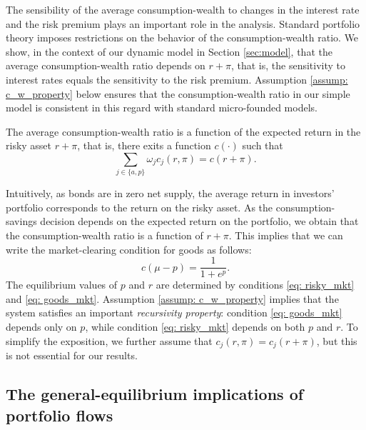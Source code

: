 The sensibility of the average consumption-wealth to changes in the interest rate and the risk premium plays an important role in the analysis. 
Standard portfolio theory imposes restrictions on the behavior of the  consumption-wealth ratio. 
We show, in the context of our dynamic model in Section \ref{sec:model}, that the average consumption-wealth ratio depends on $r+\pi$, that is, the sensitivity to interest rates equals the sensitivity to the risk premium. 
Assumption \ref{assump: c_w_property} below ensures that the consumption-wealth ratio in our simple model is consistent in this regard with standard micro-founded models.
\begin{assump}\label{assump: c_w_property}
    The average consumption-wealth ratio is a function of the expected return in the risky asset $r + \pi$, that is, there exits a function $c(\cdot)$ such that 
   \begin{equation}
        \sum_{j\in\{a,p\}} \omega_j c_j(r, \pi) = c(r+\pi).
   \end{equation}
\end{assump}
Intuitively, as bonds are in zero net supply, the average return in investors' portfolio corresponds to the return on the risky asset. As the consumption-savings decision depends on the expected return on the portfolio, we obtain that the consumption-wealth ratio is a function of $r+\pi$. This implies that we can write the market-clearing condition for goods as follows:
\begin{equation}\label{eq: goods_mkt}
    c(\mu - p) = \frac{1}{1+e^p}.
\end{equation}
The equilibrium values of $p$ and $r$ are determined by conditions \eqref{eq: risky_mkt} and \eqref{eq: goods_mkt}. 
Assumption \ref{assump: c_w_property} implies that the system satisfies an important \textit{recursivity property}: condition \eqref{eq: goods_mkt} depends only on $p$, while condition \eqref{eq: risky_mkt} depends on both $p$ and $r$. 
To simplify the exposition, we further assume that $c_j(r, \pi) = c_j(r+\pi)$, but this is not essential for our results.

\subsection{The general-equilibrium implications of portfolio flows}

